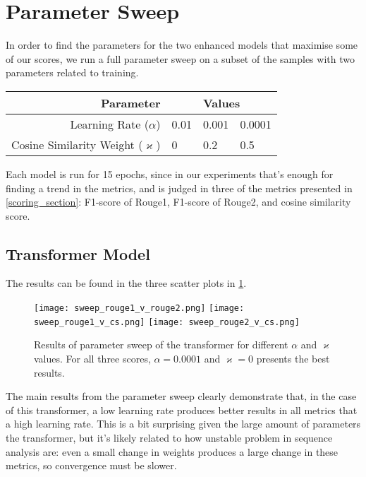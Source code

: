 \section{Parameter Sweep}
\label{param_sweep_section}

In order to find the parameters for the two enhanced models that maximise some of our scores, we run a full parameter sweep on a subset of the samples with two parameters related to training.
\begin{table}[h]
	\centering
	\begin{tabular}{r | l l l}
		\toprule
			Parameter & \multicolumn{3}{|c}{Values} \\
		\midrule
			Learning Rate ($\alpha$) & 0.01 & 0.001 & 0.0001 \\
			Cosine Similarity Weight ($\varkappa$) & 0 & 0.2 & 0.5 \\
		\bottomrule
	\end{tabular}
\end{table}

Each model is run for 15 epochs, since in our experiments that's enough for finding a trend in the metrics, and is judged in three of the metrics presented in \cref{scoring_section}: F1-score of Rouge1, F1-score of Rouge2, and cosine similarity score.

\subsection{Transformer Model}

The results can be found in the three scatter plots in \cref{sweep_results}.
\begin{figure}[h]
	\centering
	\texttt{[image: sweep\_rouge1\_v\_rouge2.png]} \hfill{}
	\texttt{[image: sweep\_rouge1\_v\_cs.png]} \hfill{}
	\texttt{[image: sweep\_rouge2\_v\_cs.png]}
	\caption{Results of parameter sweep of the transformer for different $\alpha$ and $\varkappa$ values. For all three scores, $\alpha = 0.0001$ and $\varkappa = 0$ presents the best results.}
	\label{sweep_results}
\end{figure}

The main results from the parameter sweep clearly demonstrate that, in the case of this transformer, a low learning rate produces better results in all metrics that a high learning rate.
This is a bit surprising given the large amount of parameters the transformer, but it's likely related to how unstable problem in sequence analysis are: even a small change in weights produces a large change in these metrics, so convergence must be slower.

